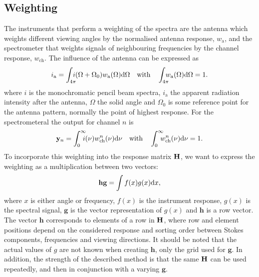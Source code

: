 \subsection{Weighting}
The instruments that perform a weighting of the spectra are the antenna which weights different viewing angles by the normalised antenna response, $w_\mathrm{a}$, and the spectrometer that weights signals of neighbouring frequencies by the channel response, $w_\mathrm{ch}$. The influence of the antenna can be expressed as
\begin{equation}
  \label{eq:sensor:weight:antenna}
  i_\mathrm{a} = \int_{4\pi}\!\!\!\!i(\Omega+\Omega_0) 
                 w_\mathrm{a}(\Omega) \DiffD\Omega
                 \quad \textrm{with} \quad 
  \int_{4\pi}\!\!\!\!w_\mathrm{a}(\Omega)\DiffD\Omega = 1.
\end{equation} 
where $i$ is the monochromatic pencil beam spectra, $i_\mathrm{a}$ the apparent radiation intensity after the antenna, $\Omega$ the solid angle and $\Omega_0$ is some reference point for the antenna pattern, normally the point of highest response. For the spectrometeral the output for channel $n$ is
\begin{equation}
  \label{eq:sensor:weight:spectrometer} 
  \MsrVct_n = \int_{0}^{\infty}\!\!\!\!i(\nu) w_\mathrm{ch}^n(\nu) \DiffD\nu 
         \quad \textrm{with} \quad 
  \int_{0}^{\infty}\!\!\!\!w_\mathrm{ch}^n(\nu)\DiffD\nu = 1.
\end{equation} 
To incorporate this weighting
into the response matrix $\mathbf{H}$, we want to express the
weighting as a multiplication between two vectors:
\begin{equation}
  \label{eq:sensor:weight:integr}
  \mathbf{h}\mathbf{g} = \int f(x)g(x)\mathrm{d} x,
\end{equation} 
where $x$ is either angle or frequency, $f(x)$ is the instrument
response, $g(x)$ is the spectral signal, $\mathbf{g}$ is the vector
representation of $g(x)$ and $\mathbf{h}$ is a row vector. The
vector $\mathbf{h}$ corresponds to elements of a row in
$\mathbf{H}$, where row and element positions depend on the considered
response and sorting order between Stokes components, frequencies
and viewing directions. It should be noted that the actual values
of $g$ are not known when creating $\mathbf{h}$, only the grid used
for $\mathbf{g}$. In addition, the strength of the described method
is that the same $\mathbf{H}$ can be used repeatedly, and then in
conjunction with a varying $\mathbf{g}$.
  
